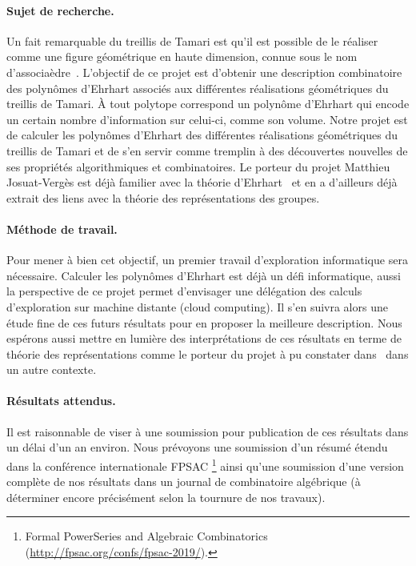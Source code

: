\documentclass[a4paper, 10pt]{article}
\numberwithin{equation}{subsection}
\begin{document}
\paragraph{Sujet de recherche.}
Un fait remarquable du treillis de Tamari est qu'il est possible de le
réaliser comme une figure géométrique en haute dimension, connue sous le
nom d'associaèdre~\cite{Lod04}. L'objectif de ce projet est d'obtenir
une description combinatoire des polynômes d'Ehrhart associés aux
différentes réalisations géométriques du treillis de Tamari. À tout
polytope correspond un polynôme d'Ehrhart qui encode un certain nombre
d'information sur celui-ci, comme son volume. Notre projet est de
calculer les polynômes d'Ehrhart des différentes réalisations
géométriques du treillis de Tamari et de s'en servir comme tremplin à
des découvertes nouvelles de ses propriétés algorithmiques et
combinatoires. Le porteur du projet Matthieu Josuat-Vergès est déjà
familier avec la théorie d'Ehrhart~\cite{HJV16} et en a d'ailleurs déjà
extrait des liens avec la théorie des représentations des groupes.
\smallbreak

\vspace{-.25cm}

\paragraph{Méthode de travail.}
Pour mener à bien cet objectif, un premier travail d'exploration
informatique sera nécessaire. Calculer les polynômes d'Ehrhart est déjà
un défi informatique, aussi la perspective de ce projet permet
d'envisager une délégation des calculs d'exploration sur machine
distante (cloud computing). Il s'en suivra alors une étude fine de ces
futurs résultats pour en proposer la meilleure description. Nous
espérons aussi mettre en lumière des interprétations de ces résultats en
terme de théorie des représentations comme le porteur du projet à pu
constater dans~\cite{HJV16} dans un autre contexte.
\smallbreak

\vspace{-.25cm}

\paragraph{Résultats attendus.}
Il est raisonnable de viser à une soumission pour publication de ces
résultats dans un délai d'un an environ. Nous prévoyons une soumission
d'un résumé étendu dans la conférence internationale FPSAC%
\footnote{Formal PowerSeries and Algebraic Combinatorics
(\url{http://fpsac.org/confs/fpsac-2019/}).}
ainsi qu'une soumission d'une version complète de nos résultats dans un
journal de combinatoire algébrique (à déterminer encore précisément
selon la tournure de nos travaux).
\smallbreak
\end{document}
